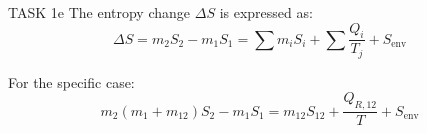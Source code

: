 TASK 1e  
The entropy change \( \Delta S \) is expressed as:  
\[
\Delta S = m_2 S_2 - m_1 S_1 = \sum m_i S_i + \sum \frac{Q_i}{T_j} + S_{\text{env}}
\]  

For the specific case:  
\[
m_{2}(m_1 + m_{12}) S_2 - m_1 S_1 = m_{12} S_{12} + \frac{Q_{R,12}}{T} + S_{\text{env}}
\]  